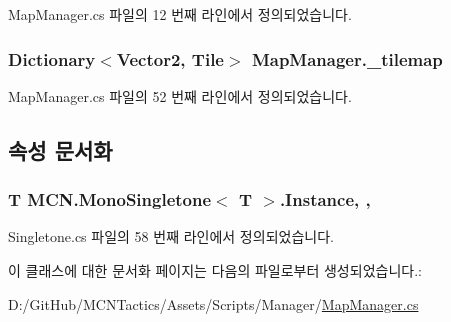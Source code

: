 Map\+Manager.\+cs 파일의 12 번째 라인에서 정의되었습니다.

\subsubsection[{\texorpdfstring{\+\_\+tilemap}{_tilemap}}]{\setlength{\rightskip}{0pt plus 5cm}Dictionary$<$Vector2, {\bf Tile}$>$ Map\+Manager.\+\_\+tilemap\hspace{0.3cm}{\ttfamily [private]}}\hypertarget{class_map_manager_a58f7635d8e19795f3845a3f85e2b4ac3}{}\label{class_map_manager_a58f7635d8e19795f3845a3f85e2b4ac3}


Map\+Manager.\+cs 파일의 52 번째 라인에서 정의되었습니다.



\subsection{속성 문서화}
\subsubsection[{\texorpdfstring{Instance}{Instance}}]{\setlength{\rightskip}{0pt plus 5cm}T {\bf M\+C\+N.\+Mono\+Singletone}$<$ T $>$.Instance\hspace{0.3cm}{\ttfamily [static]}, {\ttfamily [get]}, {\ttfamily [inherited]}}\hypertarget{class_m_c_n_1_1_mono_singletone_aa50c027cca64cf4ad30c1ee5c83e0b78}{}\label{class_m_c_n_1_1_mono_singletone_aa50c027cca64cf4ad30c1ee5c83e0b78}


Singletone.\+cs 파일의 58 번째 라인에서 정의되었습니다.



이 클래스에 대한 문서화 페이지는 다음의 파일로부터 생성되었습니다.\+:\begin{DoxyCompactItemize}
\item 
D\+:/\+Git\+Hub/\+M\+C\+N\+Tactics/\+Assets/\+Scripts/\+Manager/\hyperlink{_map_manager_8cs}{Map\+Manager.\+cs}\end{DoxyCompactItemize}
